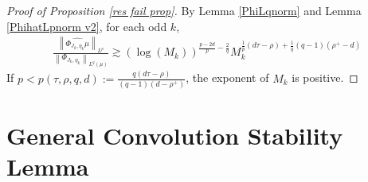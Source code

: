 \documentclass{amsart}
\numberwithin{equation}{section}
\theoremstyle{definition}
\theoremstyle{definition}
\newcommand{\norm}[1]{\left\|#1\right\|}
\begin{document}
\begin{proof}[Proof of Proposition \ref{res fail prop}]
By Lemma \ref{PhiLqnorm} and Lemma \ref{PhihatLpnorm v2}, for each odd $k$, 
\begin{align*}
\frac{\norm{\widehat{\Phi_{J_k, \eta_k} \mu}}_{L^p}}{\norm{\Phi_{J_k, \eta_k}}_{L^q(\mu)}} 
\gtrsim  
(\log(M_k))^{\frac{p - 2d}{p} - \frac{2}{q}}
M_k^{\frac{1}{p}(d\tau - \rho)  + \frac{1}{q}(q-1)(\rho^+ - d)}
\end{align*}
If $p < p(\tau, \rho, q, d) := \frac{q(d \tau - \rho)}{(q-1) (d-\rho^+)}$, the exponent of $M_k$ is positive. 
\end{proof}




\section{General Convolution Stability Lemma}\label{convstab section}
\end{document}
